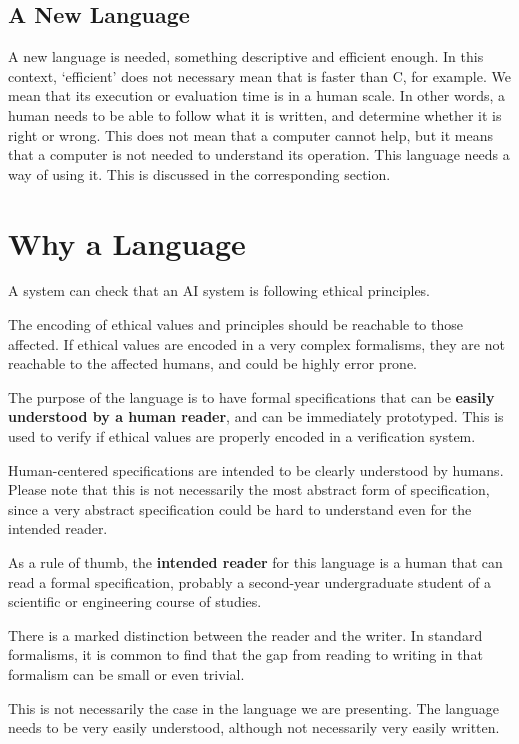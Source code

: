 \subsection{A New Language}

A new language is needed, something descriptive and efficient enough.
In this context, `efficient' does not necessary mean that is faster than C, for example.
We mean that its execution or evaluation time is in a human scale.
In other words, a human needs to be able to follow what it is written, and determine whether it is right or wrong.
This does not mean that a computer cannot help, but it means that a computer is not needed to understand its operation.
This language needs a way of using it.
This is discussed in the corresponding section.


\section{Why a Language}

A system can check that an AI system is following ethical principles.

The encoding of ethical values and principles should be reachable to those affected.
If ethical values are encoded in a very complex formalisms, they are not reachable to the affected humans, and could be highly error prone.

The purpose of the language is to have formal specifications that can be \textbf{easily understood by a human reader}, and can be immediately prototyped.
This is used to verify if ethical values are properly encoded in a verification system.

Human-centered specifications are intended to be clearly understood by humans.
Please note that this is not necessarily the most abstract form of specification, since a very abstract specification could be hard to understand even for the intended reader.

As a rule of thumb, the \textbf{intended reader} for this language is a human that can read a formal specification, probably a second-year undergraduate student of a scientific or engineering course of studies.

There is a marked distinction between the reader and the writer.
In standard formalisms, it is common to find that the gap from reading to writing in that formalism can be small or even trivial.

This is not necessarily the case in the language we are presenting.
The language needs to be very easily understood, although not necessarily very easily written.

